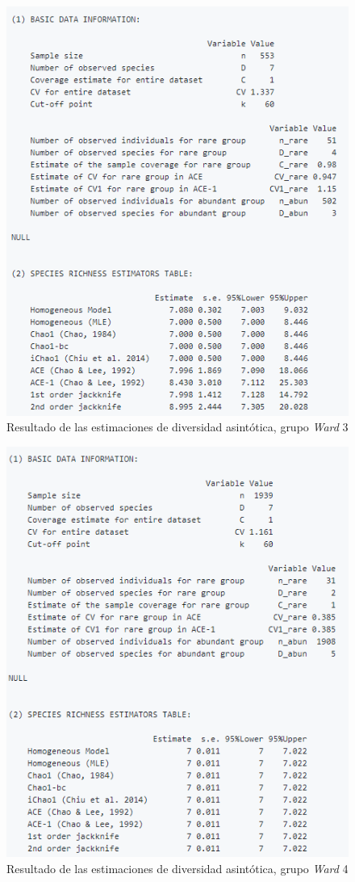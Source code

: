 \documentclass[11pt,]{article}
\begin{document}
\begin{figure}
\centering
\includegraphics{asintotico_ward3.png}
\caption{Resultado de las estimaciones de diversidad asintótica, grupo
\emph{Ward} 3 \label{fig:asintotico_ward3}}
\end{figure}

\begin{figure}
\centering
\includegraphics{asintotico_ward4.png}
\caption{Resultado de las estimaciones de diversidad asintótica, grupo
\emph{Ward} 4 \label{fig:asintotico_ward4}}
\end{figure}
\end{document}
